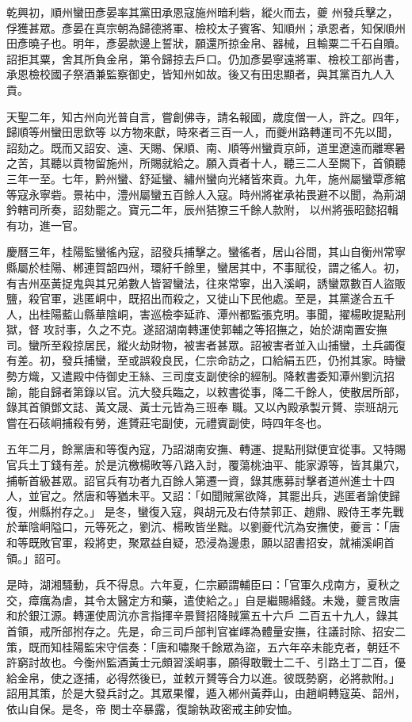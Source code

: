 \begin{pinyinscope}
 乾興初，順州蠻田彥晏率其黨田承恩寇施州暗利砦，縱火而去，夔
 州發兵擊之，俘獲甚眾。彥晏在真宗朝為歸德將軍、檢校太子賓客、知順州；承恩者，知保順州田彥曉子也。明年，彥晏款邊上誓狀，願還所掠金帛、器械，且輸粟二千石自贖。詔拒其粟，舍其所負金帛，第令歸掠去戶口。仍加彥晏寧遠將軍、檢校工部尚書，承恩檢校國子祭酒兼監察御史，皆知州如故。後又有田忠顯者，與其黨百九人入貢。



 天聖二年，知古州向光普自言，嘗創佛寺，請名報國，歲度僧一人，許之。四年，歸順等州蠻田思欽等
 以方物來獻，時來者三百一人，而夔州路轉運司不先以聞，詔劾之。既而又詔安、遠、天賜、保順、南、順等州蠻貢京師，道里遼遠而離寒暑之苦，其聽以貢物留施州，所賜就給之。願入貢者十人，聽三二人至闕下，首領聽三年一至。七年，黔州蠻、舒延蠻、繡州蠻向光緒皆來貢。九年，施州屬蠻覃彥綰等寇永寧砦。景祐中，澧州屬蠻五百餘人入寇。時州將崔承祐畏避不以聞，為荊湖鈐轄司所奏，詔劾罷之。寶元二年，辰州狤獠三千餘人款附，
 以州將張昭懿招輯有功，進一官。



 慶曆三年，桂陽監蠻徭內寇，詔發兵捕擊之。蠻徭者，居山谷間，其山自衡州常寧縣屬於桂陽、郴連賀韶四州，環紆千餘里，蠻居其中，不事賦役，謂之徭人。初，有吉州巫黃捉鬼與其兄弟數人皆習蠻法，往來常寧，出入溪峒，誘蠻眾數百人盜販鹽，殺官軍，逃匿峒中，既招出而殺之，又徙山下民他處。至是，其黨遂合五千人，出桂陽藍山縣華陰峒，害巡檢李延祚、潭州都監張克明。事聞，擢楊畋提點刑獄，督
 攻討事，久之不克。遂詔湖南轉運使郭輔之等招撫之，始於湖南置安撫司。蠻所至殺掠居民，縱火劫財物，被害者甚眾。詔被害者並入山捕蠻，土兵蠲復有差。初，發兵捕蠻，至或誤殺良民，仁宗命訪之，口給絹五匹，仍拊其家。時蠻勢方熾，又遣殿中侍御史王絲、三司度支副使徐的經制。降敕書委知潭州劉沆招諭，能自歸者第錄以官。沆大發兵臨之，以敕書從事，降二千餘人，使散居所部，錄其首領鄧文誌、黃文晟、黃士元皆為三班奉
 職。又以內殿承製亓贇、崇班胡元嘗在石硋峒捕殺有勞，進贇莊宅副使，元禮賓副使，時四年冬也。



 五年二月，餘黨唐和等復內寇，乃詔湖南安撫、轉運、提點刑獄便宜從事。又特賜官兵土丁錢有差。於是沆檄楊畋等八路入討，覆蕩桃油平、能家源等，皆其巢穴，捕斬首級甚眾。詔官兵有功者九百餘人第遷一資，錄其應募討擊者道州進士十四人，並官之。然唐和等猶未平。又詔：「如聞賊黨欲降，其罷出兵，逃匿者諭使歸復，州縣拊存之。」
 是冬，蠻復入寇，與胡元及右侍禁郭正、趙鼎、殿侍王孝先戰於華陰峒隘口，元等死之，劉沆、楊畋皆坐黜。以劉夔代沆為安撫使，夔言：「唐和等既敗官軍，殺將吏，聚眾益自疑，恐浸為邊患，願以詔書招安，就補溪峒首領。」詔可。



 是時，湖湘騷動，兵不得息。六年夏，仁宗顧謂輔臣曰：「官軍久戍南方，夏秋之交，瘴癘為虐，其令太醫定方和藥，遣使給之。」自是繼賜緡錢。未幾，夔言敗唐和於銀江源。轉運使周沆亦言指揮辛景賢招降賊黨五十六戶
 二百五十九人，錄其首領，戒所部拊存之。先是，命三司戶部判官崔嶧為體量安撫，往議討除、招安二策，既而知桂陽監宋守信奏：「唐和嘯聚千餘眾為盜，五六年卒未能克者，朝廷不許窮討故也。今衡州監酒黃士元頗習溪峒事，願得敢戰士二千、引路土丁二百，優給金帛，使之逐捕，必得然後已，並敕亓贇等合力以進。彼既勢窮，必將款附。」詔用其策，於是大發兵討之。其眾果懼，遁入郴州黃莽山，由趙峒轉寇英、韶州，依山自保。是冬，帝
 閔士卒暴露，復諭執政密戒主帥安恤。




\end{pinyinscope}
